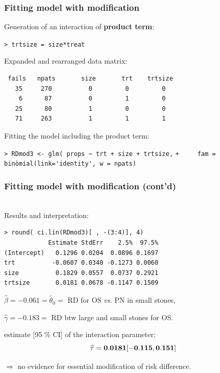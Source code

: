 \documentclass[handout,12pt]{beamer}
\begin{document}
\begin{frame}[fragile] \frametitle{Fitting model with modification}
\bi
\item
Generation of an interaction of {\bf product term}:
\bi
\item[ ] \verb|> trtsize = size*treat|
\ei
\item
Expanded and rearranged data matrix: \small
\begin{verbatim}
 fails   npats       size       trt    trtsize
   35     270          0         0         0
    6      87          0         1         0
   25      80          1         0         0
   71     263          1         1         1
\end{verbatim} \normalsize
\item
Fitting the model including the product term: 

\medskip
\verb|> RDmod3 <- glm( props ~ trt + size + trtsize,|
\verb|+     fam = binòmial(link='identity', w = npats)|
\ei
\end{frame} 


\begin{frame}[fragile] \frametitle{Fitting model with modification (cont'd)}
\ \\
Results and interpretation:
\small
\begin{verbatim}
> round( ci.lin(RDmod3)[ , -(3:4)], 4)
            Estimate StdErr    2.5%  97.5%
(Intercept)   0.1296 0.0204  0.0896 0.1697
trt          -0.0607 0.0340 -0.1273 0.0060
size          0.1829 0.0557  0.0737 0.2921
trtsize       0.0181 0.0678 -0.1147 0.1509
\end{verbatim}
\normalsize
\bi
\item $\widehat \beta = -0.061 = \widehat \theta_0 =$ RD for OS {\it vs.} PN in small stones,
\item $\widehat \gamma = -0.183 =$ RD btw large and small stones for OS.
\item estimate [95 \% CI] of the interaction parameter:
$$\widehat \tau = {\bf 0.0181 [-0.115, 0.151]}$$
\item[{ }] $\Rightarrow$ no evidence for essential modification of risk difference.
\ei
\end{frame} 
\end{document}
